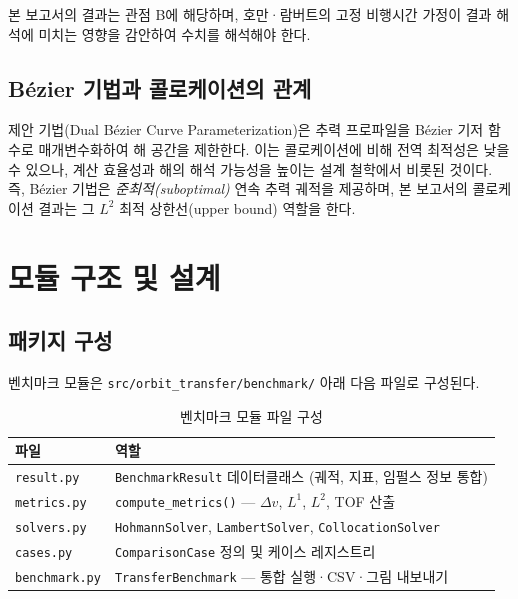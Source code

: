 \documentclass[11pt]{article}
\begin{document}
\noindent 본 보고서의 결과는 관점 B에 해당하며, 호만·람버트의 고정 비행시간 가정이 결과 해석에 미치는 영향을 감안하여 수치를 해석해야 한다.

\subsection{B\'{e}zier 기법과 콜로케이션의 관계}

제안 기법(Dual B\'{e}zier Curve Parameterization)은 추력 프로파일을 B\'{e}zier 기저 함수로 매개변수화하여 해 공간을 제한한다.
이는 콜로케이션에 비해 전역 최적성은 낮을 수 있으나, 계산 효율성과 해의 해석 가능성을 높이는 설계 철학에서 비롯된 것이다.
즉, B\'{e}zier 기법은 \textit{준최적(suboptimal)} 연속 추력 궤적을 제공하며, 본 보고서의 콜로케이션 결과는 그 $L^2$ 최적 상한선(upper bound) 역할을 한다.


\section{모듈 구조 및 설계}

\subsection{패키지 구성}

벤치마크 모듈은 \texttt{src/orbit\_transfer/benchmark/} 아래 다음 파일로 구성된다.

\begin{table}[!h]
\centering
\caption{벤치마크 모듈 파일 구성}
\label{tab:module}
\begin{tabular}{lp{9cm}}
\toprule
파일 & 역할 \\
\midrule
\texttt{result.py}    & \texttt{BenchmarkResult} 데이터클래스 (궤적, 지표, 임펄스 정보 통합) \\
\texttt{metrics.py}   & \texttt{compute\_metrics()} — $\Delta v$, $L^1$, $L^2$, TOF 산출 \\
\texttt{solvers.py}   & \texttt{HohmannSolver}, \texttt{LambertSolver}, \texttt{CollocationSolver} \\
\texttt{cases.py}     & \texttt{ComparisonCase} 정의 및 케이스 레지스트리 \\
\texttt{benchmark.py} & \texttt{TransferBenchmark} — 통합 실행·CSV·그림 내보내기 \\
\bottomrule
\end{tabular}
\end{table}
\end{document}
